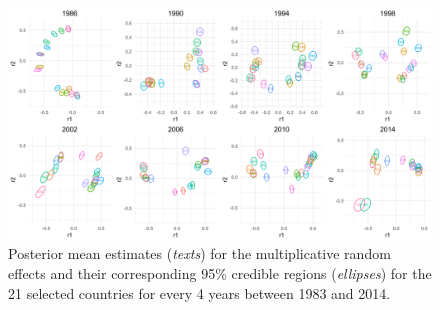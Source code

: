 \documentclass[a4paper]{article}
\begin{document}
\begin{figure}[ht]
  	\begin{center}  
  		 \includegraphics[width=1\textwidth]{plots_paper/UDU_reduced_8years-1.png}
  	\end{center}
  	\caption {Posterior mean estimates (\textit{texts}) for the multiplicative random effects and their corresponding 95\% credible regions (\textit{ellipses}) for the 21 selected countries for every 4 years between 1983 and 2014.  }
  	\label{figure:UDplot}
  \end{figure}
\end{document}
